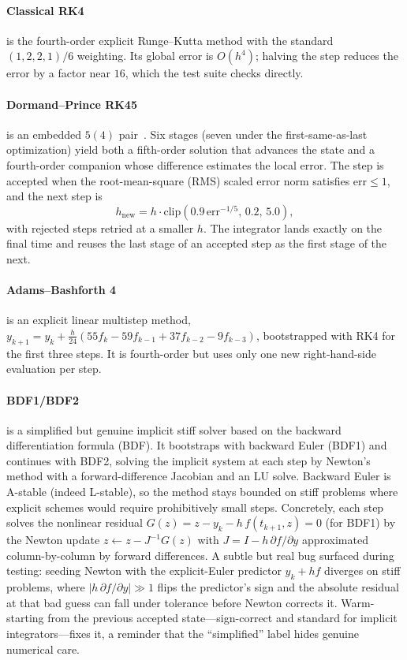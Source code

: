 \documentclass[sigplan,nonacm,screen]{acmart}
\begin{document}
\paragraph{Classical RK4} is the fourth-order explicit Runge--Kutta method with
the standard $(1,2,2,1)/6$ weighting. Its global error is $O(h^4)$; halving the
step reduces the error by a factor near $16$, which the test suite checks
directly.

\paragraph{Dormand--Prince RK45} is an embedded $5(4)$ pair~\cite{dormandprince1980}.
Six stages (seven under the first-same-as-last optimization) yield both a
fifth-order solution that advances the state and a fourth-order companion whose
difference estimates the local error. The step is accepted when the
root-mean-square (RMS) scaled
error norm satisfies $\mathrm{err} \le 1$, and the next step is
\[
  h_{\text{new}} = h \cdot \mathrm{clip}\!\left(0.9\,\mathrm{err}^{-1/5},\,0.2,\,5.0\right),
\]
with rejected steps retried at a smaller $h$. The integrator lands exactly on the
final time and reuses the last stage of an accepted step as the first stage of
the next.

\paragraph{Adams--Bashforth 4} is an explicit linear multistep method,
$y_{k+1} = y_k + \tfrac{h}{24}(55 f_k - 59 f_{k-1} + 37 f_{k-2} - 9 f_{k-3})$,
bootstrapped with RK4 for the first three steps. It is fourth-order but uses only
one new right-hand-side evaluation per step.

\paragraph{BDF1/BDF2} is a simplified but genuine implicit stiff solver based on
the backward differentiation formula (BDF). It
bootstraps with backward Euler (BDF1) and continues with BDF2, solving the
implicit system at each step by Newton's method with a forward-difference
Jacobian and an LU solve. Backward Euler is A-stable (indeed L-stable), so the
method stays bounded on stiff problems where explicit schemes would require
prohibitively small steps. Concretely, each step solves the nonlinear residual
$G(z) = z - y_k - h\,f(t_{k+1}, z) = 0$ (for BDF1) by the Newton update
$z \leftarrow z - J^{-1}G(z)$ with $J = I - h\,\partial f/\partial y$ approximated
column-by-column by forward differences. A subtle but real bug surfaced during
testing: seeding Newton with the explicit-Euler predictor $y_k + h f$ diverges on
stiff problems, where $|h\,\partial f/\partial y| \gg 1$ flips the predictor's
sign and the absolute residual at that bad guess can fall under tolerance before
Newton corrects it. Warm-starting from the previous accepted state---sign-correct
and standard for implicit integrators---fixes it, a reminder that the
``simplified'' label hides genuine numerical care.
\end{document}
